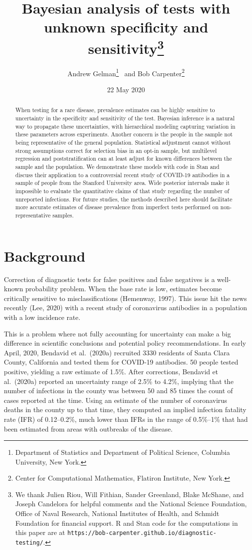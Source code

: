 \documentclass[11pt]{article}
\title{\bf Bayesian analysis of tests with unknown specificity and sensitivity\footnote{We thank Julien Riou, Will Fithian, Sander Greenland, Blake McShane, and Joseph Candelora for helpful comments and the National Science Foundation, Office of Naval Research, National Institutes of Health, and Schmidt Foundation for financial support.  R and Stan code for the computations in this paper are at {\tt https://bob-carpenter.github.io/diagnostic-testing/}.}\vspace{.1in}}
\author{Andrew Gelman\footnote{Department of Statistics and Department of
Political Science, Columbia University, New York.}  \ and Bob Carpenter\footnote{Center for Computational Mathematics, Flatiron Institute, New York.}
\vspace{.1in}}
\date{22 May 2020}
\begin{document}
\sloppy
\maketitle

\begin{abstract}
\noindent
When testing for a rare disease, prevalence estimates can be highly sensitive to uncertainty in the specificity and sensitivity of the test.  Bayesian inference is a natural way to propagate these uncertainties, with hierarchical modeling capturing variation in these parameters across experiments.  Another concern is the people in the sample not being representative of the general population.  Statistical adjustment cannot without strong assumptions correct for selection bias in an opt-in sample, but multilevel regression and poststratification can at least adjust for known differences between the sample and the population.  We demonstrate these models with code in Stan and discuss their application to a controversial recent study of COVID-19 antibodies in a sample of people from the Stanford University area.  Wide posterior intervals make it impossible to evaluate the quantitative claims of that study regarding the number of unreported infections.  For future studies, the methods described here should facilitate more accurate estimates of disease prevalence from imperfect tests performed on non-representative samples.
\end{abstract}

\section{Background}

Correction of diagnostic tests for false positives and false negatives is a well-known probability problem.  When the base rate is low, estimates become critically sensitive to misclassifications (Hemenway, 1997).  This issue hit the news recently (Lee, 2020) with a recent study of coronavirus antibodies in a population with a low incidence rate.

This is a problem where not fully accounting for uncertainty can make a big difference in scientific conclusions and potential policy recommendations.  In early April, 2020, Bendavid et al.\ (2020a) recruited 3330 residents of Santa Clara County, California and tested them for COVID-19 antibodies.  50 people tested positive, yielding a raw estimate of 1.5\%.  After corrections, Bendavid et al.\ (2020a) reported an uncertainty range of 2.5\% to 4.2\%, implying that the number of infections in the county was between 50 and 85 times the count of cases reported at the time.  Using an estimate of the number of coronavirus deaths in the county up to that time, they computed an implied infection fatality rate (IFR) of 0.12--0.2\%, much lower than IFRs in the range of 0.5\%--1\% that had been estimated from areas with outbreaks of the disease.
\end{document}
